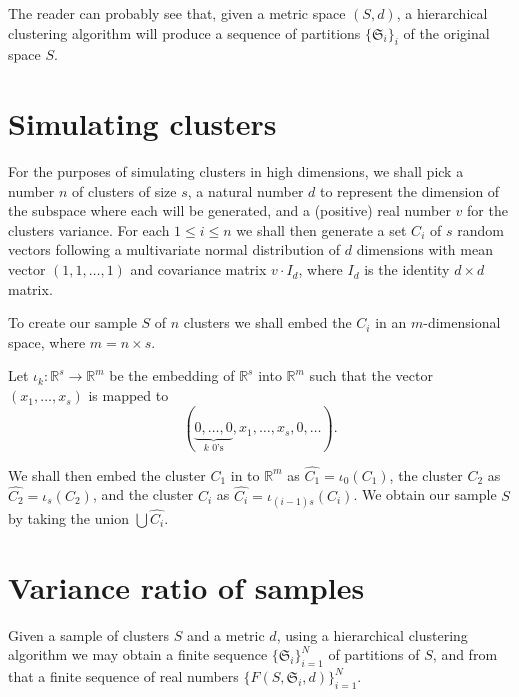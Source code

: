 \documentclass[12pt]{article}
\begin{document}
The reader can probably see that, given a metric space $(S, d)$, a hierarchical clustering algorithm will produce a sequence of partitions $\{\mathfrak{S}_i\}_{i}$ of the original space $S$.

\section{Simulating clusters}\label{sec:simulclstr}
For the purposes of simulating clusters in high dimensions, we shall pick a number $n$ of clusters of size $s$, a natural number $d$ to represent the dimension of the subspace where each will be generated, and a (positive) real number $v$ for the clusters variance. For each $1 \leq i \leq n$ we shall then generate a set $C_i$ of $s$ random vectors following a multivariate normal distribution of $d$ dimensions with mean vector $(1, 1, \ldots, 1)$ and covariance matrix $v \cdot I_d$, where $I_d$ is the identity $d \times d$ matrix.  

To create our sample $S$ of $n$ clusters we shall embed the $C_i$ in an $m$-dimensional space, where $m = n \times s$. 

Let $\iota_k : \mathbb{R}^s \to \mathbb{R}^m$ be the embedding of $\mathbb{R}^s$ into $\mathbb{R}^m$ such that the vector $(x_1, \dots, x_s)$ is mapped to $$(\underbrace{0, \dots, 0}_{k \text{ 0's}}, x_1, \dots, x_s, 0, \dots ).$$

We shall then embed the cluster $C_1$ in to $\mathbb{R}^m$ as $\widehat{C_1} = \iota_0(C_1)$, the cluster $C_2$ as $\widehat{C_2} = \iota_s(C_2)$, and the cluster $C_i$ as $\widehat{C_i} = \iota_{(i-1)s}(C_i)$.  We obtain our sample $S$ by taking the union $\bigcup \widehat{C_i}$.


\section{Variance ratio of samples}

Given a sample of clusters $S$ and a metric $d$, using a hierarchical clustering algorithm we may obtain a finite sequence  $\{ \mathfrak{S}_i \}_{i=1}^N$ of partitions of $S$, and from that a finite sequence of real numbers $\{F(S, \mathfrak{S}_i, d) \}_{i = 1}^N$.
\end{document}
